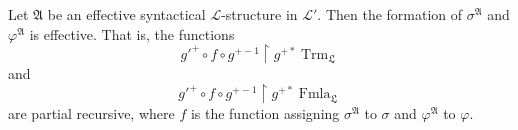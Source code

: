 Let $\mathfrak{A}$ be an effective syntactical $\mathcal{L}$-structure in $\mathcal{L}'$. Then the formation of $\sigma^{\mathfrak{A}}$ and $\varphi^{\mathfrak{A}}$ is effective. That is, the functions
$$g'^+ \circ f \circ g^{+-1} \upharpoonright g^{+*} \operatorname{Trm}_{\mathfrak{L}}$$
and
$$g'^+ \circ f \circ g^{+-1} \upharpoonright g^{+*} \operatorname{Fmla}_{\mathfrak{L}}$$
are partial recursive, where $f$ is the function assigning $\sigma^{\mathfrak{A}}$ to $\sigma$ and $\varphi^{\mathfrak{A}}$ to $\varphi$.
